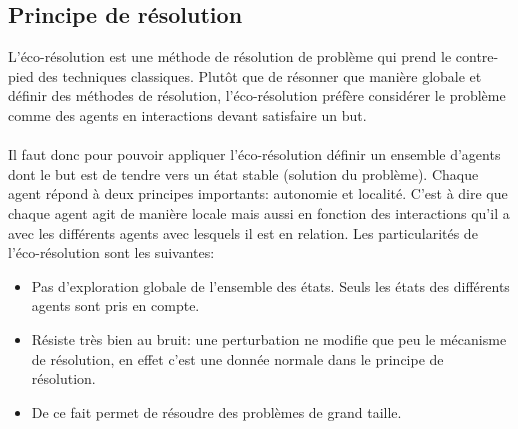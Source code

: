     \subsection{Principe de résolution}
        L'éco-résolution est une méthode de résolution de problème qui prend le contre-pied des techniques classiques. Plutôt que de résonner que manière globale et définir des méthodes de résolution, l'éco-résolution préfère considérer le problème comme des agents en interactions devant satisfaire un but. \\ \\
        Il faut donc pour pouvoir appliquer l'éco-résolution définir un ensemble d'agents dont le but est de tendre vers un état stable (solution du problème). Chaque agent répond à deux principes importants: autonomie et localité. C'est à dire que chaque agent agit de manière locale mais aussi en fonction des interactions qu'il a avec les différents agents avec lesquels il est en relation.
        Les particularités de l'éco-résolution sont les suivantes:
        \begin{itemize}
        \item Pas d'exploration globale de l'ensemble des états. Seuls les états des différents agents sont pris en compte. 
        \item Résiste très bien au bruit: une perturbation ne modifie que peu le mécanisme de résolution, en effet c'est une donnée normale dans le principe de résolution.
        \item De ce fait permet de résoudre des problèmes de grand taille. 
        \end{itemize}
    
